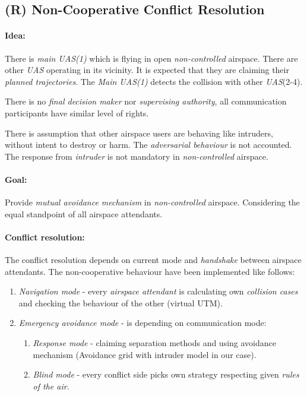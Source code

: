\subsection{(R) Non-Cooperative Conflict Resolution}\label{sec:nonCooperativeConflictResolution}

\paragraph{Idea:} There is \emph{main UAS(1)} which is flying in open \emph{non-controlled} airspace. There are other \emph{UAS} operating in its vicinity. It is expected that they are claiming their \emph{planned trajectories}. The \emph{Main UAS(1)} detects the collision with other \emph{UAS}(2-4).

There is no \emph{final decision maker} nor \emph{supervising authority}, all communication participants have similar level of rights. 
\begin{note}
    There is assumption that other airspace users are behaving like intruders, without intent to destroy or harm. The \emph{adversarial behaviour} is not accounted. The response from \emph{intruder} is not mandatory in \emph{non-controlled} airspace.
\end{note}

\paragraph{Goal:} Provide \emph{mutual avoidance mechanism} in \emph{non-controlled} airspace. Considering the equal standpoint of all airspace attendants.

\paragraph{Conflict resolution:} The conflict resolution depends on current mode and \emph{handshake} between airspace attendants. The non-cooperative behaviour have been implemented like follows:

\begin{enumerate}
    \item\emph{Navigation mode} - every \emph{airspace attendant} is calculating own \emph{collision cases} and checking the behaviour of the other (virtual UTM).
    
    \item\emph{Emergency avoidance mode} - is depending on communication mode:
    \begin{enumerate}[a]
        \item\emph{Response mode} - claiming separation methods and using avoidance mechanism (Avoidance grid with intruder model in our case).
        
        \item\emph{Blind mode} - every conflict side picks own strategy respecting given \emph{rules of the air}.
    \end{enumerate}
\end{enumerate}

